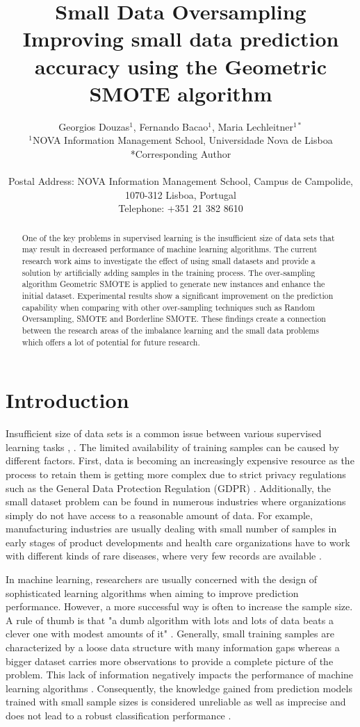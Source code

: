\documentclass[parskip=full]{scrartcl}
\title{Small Data Oversampling  \\ \LARGE{Improving small data prediction accuracy using the Geometric SMOTE algorithm}}
\author{
	Georgios Douzas\(^{1}\), Fernando Bacao\(^{1}\), Maria Lechleitner\(^{1*}\) 
	\\
	\small{\(^{1}\)NOVA Information Management School, Universidade Nova de Lisboa}
	\\
	\small{*Corresponding Author}
	\\
	\\
	\small{Postal Address: NOVA Information Management School, Campus de Campolide, 1070-312 Lisboa, Portugal}
	\\
	\small{Telephone: +351 21 382 8610}
}
\date{}
\begin{document}
\maketitle

\begin{abstract}
One of the key problems in supervised learning is the insufficient size of data
sets that may result in decreased performance of machine learning algorithms.
The current research work aims to investigate the effect of using small datasets
and provide a solution by artificially adding samples in the training process.
The over-sampling algorithm Geometric SMOTE is applied to generate new instances
and enhance the initial dataset. Experimental results show a significant
improvement on the prediction capability when comparing with other over-sampling
techniques such as Random Oversampling, SMOTE and Borderline SMOTE. These
findings create a connection between the research areas of the imbalance learning
and the small data problems which offers a lot of potential for future research.
\end{abstract}

\section{Introduction}
Insufficient size of data sets is a common issue between various supervised
learning tasks \cite{Niyogi.1998}, \cite{AbdulLateh.2017}. The limited
availability of training samples can be caused by different factors. First, data
is becoming an increasingly expensive resource \cite{Li.2007} as the process to
retain them is getting more complex due to strict privacy regulations such as
the General Data Protection Regulation (GDPR) \cite{EuropeanCommission.2019}.
Additionally, the small dataset problem can be found in numerous industries
where organizations simply do not have access to a reasonable amount of data.
For example, manufacturing industries are usually dealing with small number of
samples in early stages of product developments and health care organizations
have to work with different kinds of rare diseases, where very few records are
available \cite{AbdulLateh.2017}.

In machine learning, researchers are usually concerned with the design of
sophisticated learning algorithms when aiming to improve prediction performance.
However, a more successful way is often to increase the sample size. A rule of
thumb is that "a dumb algorithm with lots and lots of data beats a clever one
with modest amounts of it" \cite{Domingos.2012}. Generally, small training
samples are characterized by a loose data structure with many information gaps
whereas a bigger dataset carries more observations to provide a complete picture
of the problem. This lack of information negatively impacts the performance of
machine learning algorithms \cite{Lin.2018}. Consequently, the knowledge gained
from prediction models trained with small sample sizes is considered unreliable
as well as imprecise and does not lead to a robust classification performance
\cite{AbdulLateh.2017}.
\end{document}
